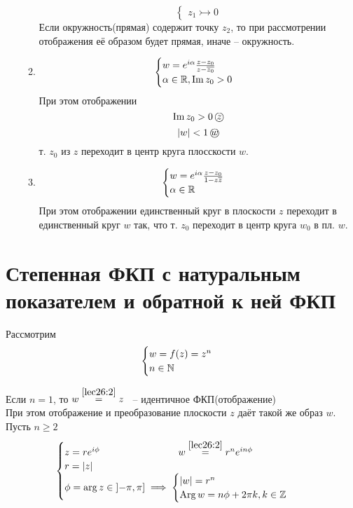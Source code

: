 \documentclass[../../main.tex]{subfiles}
\begin{document}
\begin{examples}
\begin{enumerate}
\begin{enumerate}
\[\begin{cases}
  z_1 \rightarrowtail 0   
 \end{cases}
 \]
Если окружность(прямая) содержит точку $z_2$, то при рассмотрении отображения
её образом будет прямая, иначе -- окружность.
 \item
\[
\begin{cases}
 w = e^{i\alpha} \frac{z - z_0}{z- \overline{z_0}} \\
 \alpha \in \mathbb{R},  \operatorname{Im} z_0 > 0
\end{cases}     
\]
При этом отображении 
\[
\operatorname{Im} z_0 > 0\,  \text{\textcircled{$z$}}
\]
\[
|w| < 1\,  \text{\textcircled{$w$}}
\]
т. $z_0$ из \textcircled{$z$} переходит в центр круга плосскости
\textcircled{$w$}.

 \item
\[
 \begin{cases}
  w = e^{i\alpha} \frac{z - z_0}{1 - z \overline{z}} \\
  \alpha \in \mathbb{R}
 \end{cases}
\]
При этом отображении единственный круг в плоскости \textcircled{$z$}
переходит в единственный круг \textcircled{$w$} так, что т. $z_0$ переходит
в центр круга  $w_0$ в пл. \textcircled{$w$}.


\end{enumerate}

\end{enumerate}
\end{examples}

\section{Степенная ФКП с натуральным показателем и обратной к ней ФКП}
Рассмотрим
\begin{equation}
\label{lec26:2}
\begin{cases}
 w = f(z) = z^n \\
 n \in \mathbb{N}
\end{cases}
\end{equation}

Если $n = 1$, то $w \stackrel{\eqref{lec26:2}}{=} z$ ~-- 
идентичное ФКП(отображение) \\
При этом отображение и преобразование плоскости \textcircled{$z$} 
даёт такой же образ \textcircled{$w$}. \\
Пусть $n \geq 2$
\[
\begin{cases}
 z =re^{i\phi} \qquad\qquad\qquad\qquad 
 w\stackrel{\eqref{lec26:2}}{=} r^ne^{in\phi}\\
 r = |z| \\
 \phi = \operatorname{arg} z \in \left] -\pi, \pi \right] \implies 
 \begin{cases}
 |w| = r^{n} \\
 \operatorname{Arg}w = n \phi + 2\pi k, k \in \mathbb{Z}
 \end{cases}
\end{cases}
\]
\end{document}

